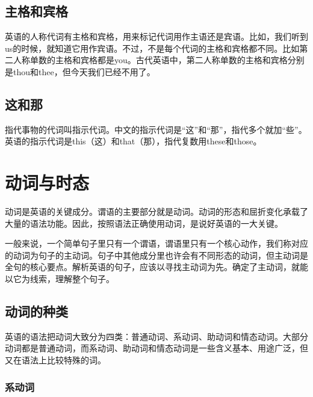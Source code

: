 \documentclass[10.5pt, a4paper]{ctexbook} %
\begin{document}
\section{主格和宾格}

英语的人称代词有主格和宾格，用来标记代词用作主语还是宾语。比如，我们听到us的时候，就知道它用作宾语。不过，不是每个代词的主格和宾格都不同。比如第二人称单数的主格和宾格都是you。古代英语中，第二人称单数的主格和宾格分别是thou和thee，但今天我们已经不用了。

\section{这和那}

指代事物的代词叫指示代词。中文的指示代词是“这”和“那”，指代多个就加“些”。英语的指示代词是this（这）和that（那），指代复数用these和those。

\begin{liju}
\end{liju}

\chapter{动词与时态}

动词是英语的关键成分。谓语的主要部分就是动词。动词的形态和屈折变化承载了大量的语法功能。因此，按照语法正确使用动词，是说好英语的一大关键。

一般来说，一个简单句子里只有一个谓语，谓语里只有一个核心动作，我们称对应的动词为句子的主动词。句子中其他成分里也许会有不同形态的动词，但主动词是全句的核心要点。解析英语的句子，应该以寻找主动词为先。确定了主动词，就能以它为线索，理解整个句子。

\section{动词的种类}

英语的语法把动词大致分为四类：普通动词、系动词、助动词和情态动词。大部分动词都是普通动词，而系动词、助动词和情态动词是一些含义基本、用途广泛，但又在语法上比较特殊的词。

\subsection{系动词}
\end{document}
